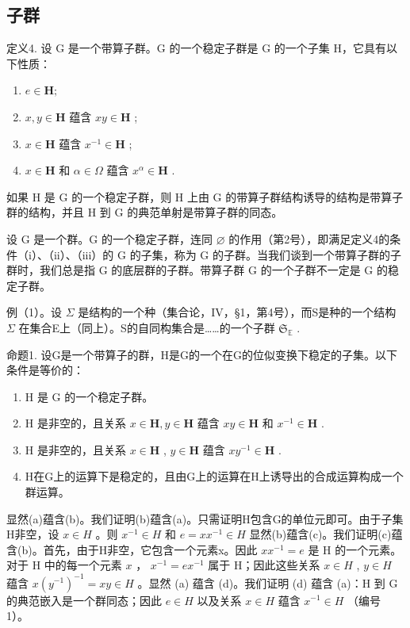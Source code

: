 \subsection{子群}

定义4. 设 G 是一个带算子群。G 的一个稳定子群是 G 的一个子集 H，它具有以下性质：

\begin{enumerate}
\def\labelenumi{(\roman{enumi})}
\item
  \(e\in \mathbf{H};\)
\item
  \(x, y \in \mathbf{H}\) 蕴含 \(xy \in \mathbf{H}\) ;
\item
  \(x \in \mathbf{H}\) 蕴含 \(x^{-1} \in \mathbf{H}\) ;
\item
  \(x \in \mathbf{H}\) 和 \(\alpha \in \Omega\) 蕴含 \(x^{\alpha} \in \mathbf{H}\) .
\end{enumerate}

如果 H 是 G 的一个稳定子群，则 H 上由 G 的带算子群结构诱导的结构是带算子群的结构，并且 H 到 G 的典范单射是带算子群的同态。

设 G 是一个群。G 的一个稳定子群，连同 \(\varnothing\) 的作用（第2号），即满足定义4的条件（i）、（ii）、（iii）的 G 的子集，称为 G 的子群。当我们谈到一个带算子群的子群时，我们总是指 G 的底层群的子群。带算子群 G 的一个子群不一定是 G 的稳定子群。

例（1）。设 \(\Sigma\) 是结构的一个种（集合论，IV，§1，第4号），而S是种的一个结构 \(\Sigma\) 在集合E上（同上）。S的自同构集合是……的一个子群 \(\mathfrak{S}_{\mathbb{E}}\) .

命题1. 设G是一个带算子的群，H是G的一个在G的位似变换下稳定的子集。以下条件是等价的：

\begin{enumerate}
\def\labelenumi{(\alph{enumi})}
\item
  H 是 G 的一个稳定子群。
\item
  H 是非空的，且关系 \(x \in \mathbf{H}, y \in \mathbf{H}\) 蕴含 \(xy \in \mathbf{H}\) 和 \(x^{-1} \in \mathbf{H}\) .
\item
  H 是非空的，且关系 \(x \in \mathbf{H}\) , \(y \in \mathbf{H}\) 蕴含 \(xy^{-1} \in \mathbf{H}\) .
\item
  H在G上的运算下是稳定的，且由G上的运算在H上诱导出的合成运算构成一个群运算。
\end{enumerate}

显然(a)蕴含(b)。我们证明(b)蕴含(a)。只需证明H包含G的单位元即可。由于子集H非空，设 \(x \in H\) 。则 \(x^{-1} \in H\) 和 \(e = xx^{-1} \in H\) 显然(b)蕴含(c)。我们证明(c)蕴含(b)。首先，由于H非空，它包含一个元素x。因此 \(xx^{-1} = e\) 是 H 的一个元素。对于 H 中的每一个元素 \(x\) ， \(x^{-1} = ex^{-1}\) 属于 H；因此这些关系 \(x \in H\) , \(y \in H\) 蕴含 \(x(y^{-1})^{-1} = xy \in H\) 。显然 (a) 蕴含 (d)。我们证明 (d) 蕴含 (a)：H 到 G 的典范嵌入是一个群同态；因此 \(e \in H\) 以及关系 \(x \in H\) 蕴含 \(x^{-1} \in H\) （编号 1）。

